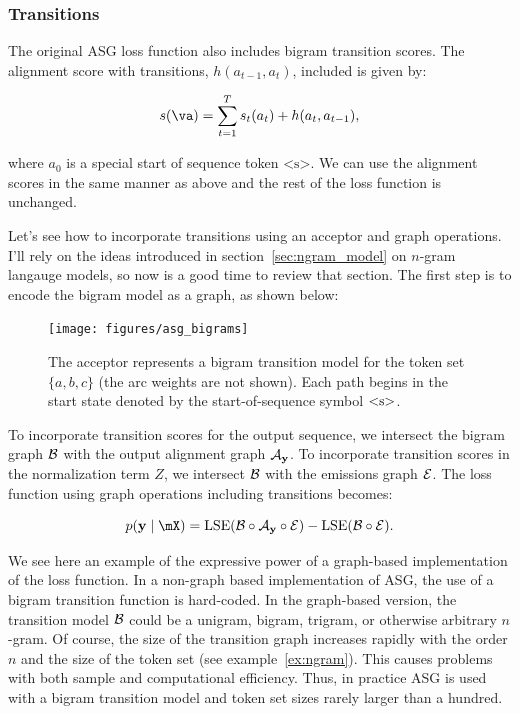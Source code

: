 \subsubsection{Transitions}

The original ASG loss function also includes bigram transition scores. The
alignment score with transitions, $h(a_{t-1}, a_t)$, included is given by:

$$
s(\va) = \sum_{t=1}^T s_t(a_t) + h(a_t, a_{t-1}),
$$

where $a_0$ is a special start of sequence token $\textrm{<s>}$. We can use the
alignment scores in the same manner as above and the rest of the loss function
is unchanged.

Let's see how to incorporate transitions using an acceptor and graph
operations. I'll rely on the ideas introduced in section~\ref{sec:ngram_model}
on $n$-gram langauge models, so now is a good time to review that section. The
first step is to encode the bigram model as a graph, as shown below:

\begin{figure}
    \centering
    \texttt{[image: figures/asg\_bigrams]}
    \caption{The acceptor represents a bigram transition model for the token
    set $\{a, b, c\}$ (the arc weights are not shown). Each path begins in the
    start state denoted by the start-of-sequence symbol $\textrm{<s>}$.}
    \label{fig:asg_bigrams}
\end{figure}

To incorporate transition scores for the output sequence, we intersect the
bigram graph $\mathcal{B}$ with the output alignment graph $\mathcal{A}_{\bf y}$. To incorporate
transition scores in the normalization term $Z$, we intersect $\mathcal{B}$ with the
emissions graph $\mathcal{E}$. The loss function using graph operations including
transitions becomes:

$$
p(\vy \mid \mX) = \LSE(\gB \circ \gA_\vy \circ \gE) - \LSE(\gB \circ \gE).
$$

We see here an example of the expressive power of a graph-based implementation
of the loss function. In a non-graph based implementation of ASG, the use of a
bigram transition function is hard-coded. In the graph-based version, the
transition model $\mathcal{B}$ could be a unigram, bigram, trigram, or otherwise
arbitrary $n$-gram. Of course, the size of the transition graph increases
rapidly with the order $n$ and the size of the token set (see
example~\ref{ex:ngram}). This causes problems with both sample and
computational efficiency. Thus, in practice ASG is used with a bigram
transition model and token set sizes rarely larger than a hundred.

